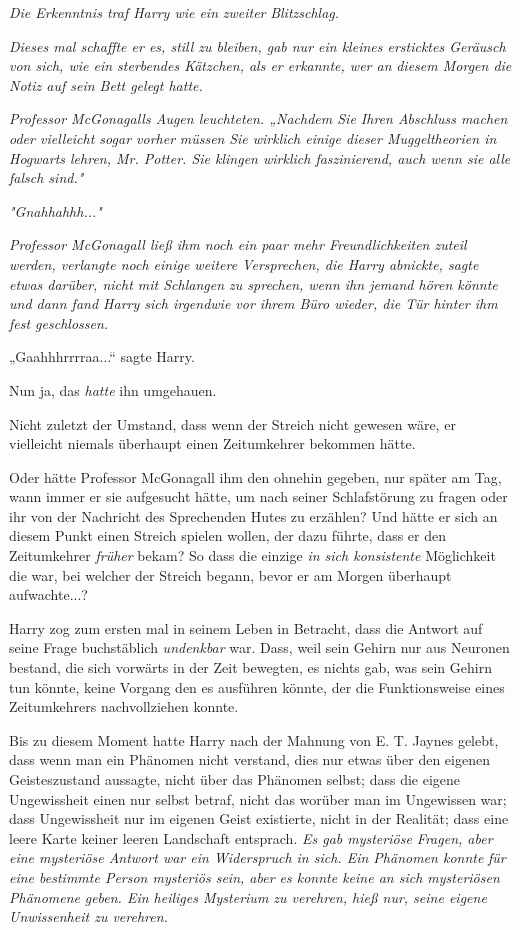 {\emph{Die Erkenntnis traf Harry wie ein} \emph{\emph{zweiter}} \emph{Blitzschlag.}

\emph{Dieses mal schaffte er es, still zu bleiben, gab nur ein kleines ersticktes Geräusch von sich, wie ein sterbendes Kätzchen, als er erkannte, wer an} \emph{diesem Morgen die Notiz auf sein Bett gelegt hatte.}

\emph{Professor McGonagalls Augen leuchteten. „Nachdem Sie Ihren Abschluss machen oder vielleicht sogar vorher} \emph{\emph{müssen}} \emph{Sie wirklich einige dieser Muggeltheorien in Hogwarts lehren, Mr. Potter. Sie klingen wirklich faszinierend, auch wenn sie alle falsch sind."}

\emph{"Gnahhahhh..."}

\emph{Professor McGonagall ließ ihm noch ein paar mehr Freundlichkeiten zuteil werden, verlangte noch einige weitere Versprechen, die Harry abnickte, sagte etwas darüber, nicht mit Schlangen zu sprechen, wenn ihn jemand hören könnte und dann fand Harry sich irgendwie vor ihrem Büro wieder, die Tür hinter ihm fest geschlossen.}

„Gaahhhrrrraa...“ sagte Harry.

Nun ja, das \emph{hatte} ihn umgehauen.

Nicht zuletzt der Umstand, dass wenn der Streich nicht gewesen wäre, er vielleicht niemals überhaupt einen Zeitumkehrer bekommen hätte.

Oder hätte Professor McGonagall ihm den ohnehin gegeben, nur später am Tag, wann immer er sie aufgesucht hätte, um nach seiner Schlafstörung zu fragen oder ihr von der Nachricht des Sprechenden Hutes zu erzählen? Und hätte er sich an diesem Punkt einen Streich spielen wollen, der dazu führte, dass er den Zeitumkehrer \emph{früher} bekam? So dass die einzige \emph{in sich konsistente} Möglichkeit die war, bei welcher der Streich begann, bevor er am Morgen überhaupt aufwachte...?

Harry zog zum ersten mal in seinem Leben in Betracht, dass die Antwort auf seine Frage buchstäblich \emph{undenkbar} war. Dass, weil sein Gehirn nur aus Neuronen bestand, die sich vorwärts in der Zeit bewegten, es nichts gab, was sein Gehirn tun könnte, keine Vorgang den es ausführen könnte, der die Funktionsweise eines Zeitumkehrers nachvollziehen konnte.

Bis zu diesem Moment hatte Harry nach der Mahnung von E. T. Jaynes gelebt, dass wenn man ein Phänomen nicht verstand, dies nur etwas über den eigenen Geisteszustand aussagte, nicht über das Phänomen selbst; dass die eigene Ungewissheit einen nur selbst betraf, nicht das worüber man im Ungewissen war; dass Ungewissheit nur im eigenen Geist existierte, nicht in der Realität; dass eine leere Karte keiner leeren Landschaft entsprach. \emph{Es gab mysteriöse Fragen, aber eine mysteriöse Antwort war ein Widerspruch in sich. Ein Phänomen konnte} \emph{\emph{für}} \emph{eine bestimmte Person mysteriös sein, aber es konnte keine an sich mysteriösen Phänomene} \emph{geben. Ein heiliges Mysterium zu verehren, hieß nur, seine eigene Unwissenheit zu verehren.}

}
